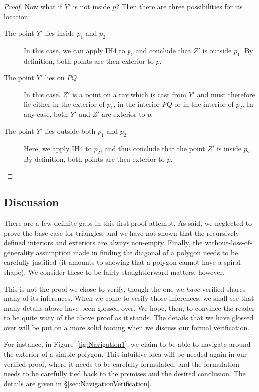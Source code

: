 \begin{description}
\begin{proof}
    Now what if $Y'$ is not inside $p$? Then there are three possibilities for its location:
    \begin{description}
    \item[The point $Y'$ lies inside $p_1$ and $p_2$] In this case, we can apply IH4 to $p_1$ and conclude that $Z'$ is outside $p_1$. By definition, both points are then exterior to $p$. 
    \item[The point $Y'$ lies on $PQ$] In this case, $Z'$ is a point on a ray which is cast from $Y'$ and must therefore lie either in the exterior of $p_1$, in the interior $PQ$ or in the interior of $p_2$. In any case, both $Y'$ and $Z'$ are exterior to $p$.
    \item[The point $Y'$ lies outside both $p_1$ and $p_2$] Here, we apply IH4 to $p_2$, and thus conclude that the point $Z'$ is inside $p_2$. By definition, both points are then exterior to $p$.
    \end{description}
  \end{proof}
\end{description}

\subsection{Discussion}
There are a few definite gaps in this first proof attempt. As said, we neglected to prove the base case for triangles, and we have not shown that the recursively defined interiors and exteriors are always non-empty. Finally, the without-loss-of-generality assumption made in finding the diagonal of a polygon needs to be carefully justified (it amounts to showing that a polygon cannot have a spiral shape).
 We consider these to be fairly straightforward matters, however. 

This is not the proof we chose to verify, though the one we \emph{have} verified shares many of its inferences. When we come to verify those inferences, we shall see that many details above have been glossed over. We hope, then, to convince the reader to be quite wary of the above proof as it stands. The details that we have glossed over will be put on a more solid footing when we discuss our formal verification.

\label{sec:Jordan1NavigationDiscussion}For instance, in Figure~\ref{fig:Navigation1}, we claim to be able to navigate around the exterior of a simple polygon. This intuitive idea will be needed again in our verified proof, where it needs to be carefully formulated, and the formulation needs to be carefully tied back to the premises and the desired conclusion. The details are given in \S\ref{sec:NavigationVerification}.

